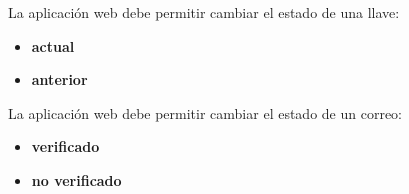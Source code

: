 {
  La aplicación web debe permitir cambiar el estado de una llave:
  \begin{itemize}
    \item \textbf{actual}
    \item \textbf{anterior}
  \end{itemize}
}

{
  La aplicación web debe permitir cambiar el estado de un correo:
  \begin{itemize}
    \item \textbf{verificado}
    \item \textbf{no verificado}
  \end{itemize}
}
